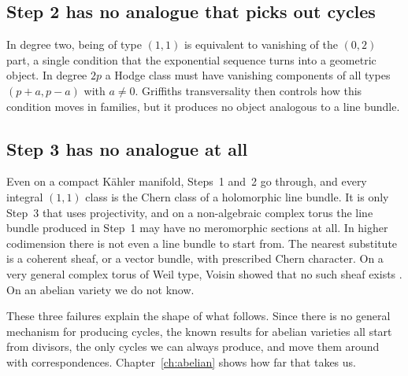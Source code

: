 \subsection*{Step 2 has no analogue that picks out cycles}
In degree two, being of type $(1,1)$ is equivalent to vanishing of the
$(0,2)$ part, a single condition that the exponential sequence turns into
a geometric object. In degree $2p$ a Hodge class must have vanishing
components of all types $(p+a,p-a)$ with $a\ne0$. Griffiths transversality
then controls how this condition moves in families, but it produces no
object analogous to a line bundle.

\subsection*{Step 3 has no analogue at all}
Even on a compact K\"ahler manifold, Steps~1 and~2 go through, and every
integral $(1,1)$ class is the Chern class of a holomorphic line bundle. It
is only Step~3 that uses projectivity, and on a non-algebraic complex torus
the line bundle produced in Step~1 may have no meromorphic sections at all.
In higher codimension there is not even a line bundle to start from. The
nearest substitute is a coherent sheaf, or a vector bundle, with prescribed
Chern character. On a very general complex torus of Weil type, Voisin
showed that no such sheaf exists \cite{Voi02b}. On an abelian variety we do
not know.

These three failures explain the shape of what follows. Since there is no
general mechanism for producing cycles, the known results for abelian
varieties all start from divisors, the only cycles we can always produce,
and move them around with correspondences. Chapter~\ref{ch:abelian} shows
how far that takes us.
